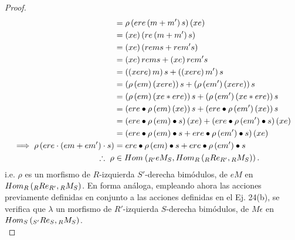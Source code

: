 \documentclass{article}
\newcommand{\lrprth}[1]{
	\left(#1\right)
}
\newcommand{\ringbimod}[4]{
	\if#4l
	{}_{#1-#2}#3
	\else
	\if#4r
	#3_{#1-#2}
	\else 
	\ifstrequal{#4}{lr}{
		{}_{#1}#3_{#2}
	}
	\fi
	\fi
}
\newcommand{\ringmodhom}[3]{
	Hom_{#1}\lrprth{#2,#3}
}
\theoremstyle{definition}
\theoremstyle{plain}
\theoremstyle{plain}
\theoremstyle{definition}
\theoremstyle{definition}
\theoremstyle{definition}
\theoremstyle{definition}
\theoremstyle{definition}
\theoremstyle{definition}
\begin{document}
\begin{enumerate}[label=\textbf{Ej \arabic*.}]
\begin{proof}
\begin{align*}
		&=\rho\lrprth{ere\lrprth{m+m'}s}(xe)\\
		&=\lrprth{xe}\lrprth{re\lrprth{m+m'}s}\\
		&=\lrprth{xe}\lrprth{rems+rem's}\\
		&=\lrprth{xe}{rems}+\lrprth{xe}{rem's}\\
		&=\lrprth{\lrprth{xere}m}s+\lrprth{\lrprth{xere}m'}s\\
		&=\lrprth{\rho\lrprth{em}\lrprth{xere}}s+\lrprth{\rho\lrprth{em'}\lrprth{xere}}s\\
		&=\lrprth{\rho\lrprth{em}\lrprth{xe*ere}}s+\lrprth{\rho\lrprth{em'}\lrprth{xe*ere}}s\\
		&=\lrprth{ere\bullet\rho\lrprth{em}\lrprth{xe}}s+\lrprth{ere\bullet\rho\lrprth{em'}\lrprth{xe}}s\\
		&=\lrprth{ere\bullet\rho\lrprth{em}\bullet s}\lrprth{xe}+\lrprth{ere\bullet\rho\lrprth{em'}\bullet s}\lrprth{xe}\\
		&=\lrprth{ere\bullet\rho\lrprth{em}\bullet s+ere\bullet\rho\lrprth{em'}\bullet s}\lrprth{xe}\\
		\implies \rho\lrprth{{ere}\cdot\lrprth{em+em'}\cdot s}&=ere\bullet\rho\lrprth{em}\bullet s+ere\bullet\rho\lrprth{em'}\bullet s\\
		\therefore\  \rho&\in\ringmodhom{}{\ringbimod{R'}{S}{eM}{lr}}{\ringmodhom{R}{\ringbimod{R}{R'}{Re}{lr}}{\ringbimod{R}{S}{M}{lr}}}.
	\end{align*}
i.e. $\rho$ es un morfismo de $R$-izquierda $S'$-derecha bimódulos, de $eM$ en $\ringmodhom{R}{\ringbimod{R}{R'}{Re}{lr}}{\ringbimod{R}{S}{M}{lr}}$. En forma análoga, empleando ahora las acciones previamente definidas en conjunto a las acciones definidas en el Ej. 24(b), se verifica que $\lambda$ un morfismo de $R'$-izquierda $S$-derecha bimódulos, de $M\epsilon$ en $\ringmodhom{S}{\ringbimod{S'}{S }{Re}{lr}}{\ringbimod{R}{S}{M}{lr}}$.\\
\end{proof}


\end{enumerate}
\end{document}
